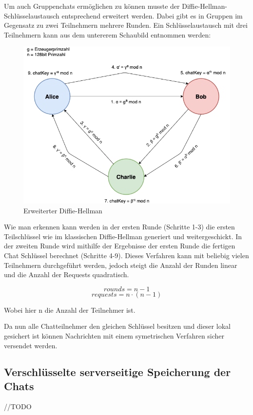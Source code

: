 Um auch Gruppenchats ermöglichen zu können musste der 
Diffie-Hellman-Schlüsselaustausch entsprechend erweitert werden.
Dabei gibt es in Gruppen im Gegensatz zu zwei Teilnehmern 
mehrere Runden. Ein Schlüsselaustausch mit drei Teilnehmern kann
aus dem untererem Schaubild entnommen werden:

\begin{figure}[h]
  \centering
  \includegraphics[width=\textwidth]{dh.png}
  
  \caption{Erweiterter Diffie-Hellman}
  \label{}
\end{figure}

Wie man erkennen kann werden in der ersten Runde (Schritte 1-3)
die ersten Teilschlüssel wie im klassischen Diffie-Hellman generiert
und weitergeschickt. In der zweiten Runde wird mithilfe der Ergebnisse
der ersten Runde die fertigen Chat Schlüssel berechnet (Schritte 4-9).
Dieses Verfahren kann mit beliebig vielen Teilnehmern durchgeführt
werden, jedoch steigt die Anzahl der Runden linear und die Anzahl der 
Requests quadratisch.

$$ rounds = n - 1 $$
$$ requests = n \cdot (n - 1) $$

Wobei hier n die Anzahl der Teilnehmer ist.

Da nun alle Chatteilnehmer den gleichen Schlüssel besitzen und dieser 
lokal gesichert ist können Nachrichten mit einem symetrischen Verfahren
sicher versendet werden.

\subsection{Verschlüsselte serverseitige Speicherung der Chats}
//TODO

